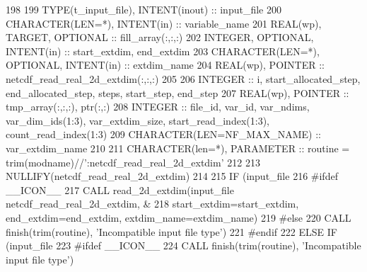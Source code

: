 \begin{DoxyCode}
198 
199     \textcolor{keywordtype}{TYPE}(t\_input\_file),         \textcolor{keywordtype}{INTENT(inout)} :: input\_file
200     \textcolor{keywordtype}{CHARACTER(LEN=*)},           \textcolor{keywordtype}{INTENT(in)}    :: variable\_name
201     \textcolor{keywordtype}{REAL(wp)}, \textcolor{keywordtype}{TARGET}, \textcolor{keywordtype}{OPTIONAL}                :: fill\_array(:,:,:)
202     \textcolor{keywordtype}{INTEGER}, \textcolor{keywordtype}{OPTIONAL},          \textcolor{keywordtype}{INTENT(in)}    :: start\_extdim, end\_extdim
203     \textcolor{keywordtype}{CHARACTER(LEN=*)}, \textcolor{keywordtype}{OPTIONAL}, \textcolor{keywordtype}{INTENT(in)}    :: extdim\_name
204     \textcolor{keywordtype}{REAL(wp)}, \textcolor{keywordtype}{POINTER}                         :: netcdf\_read\_real\_2d\_extdim(:,:,:)
205 
206     \textcolor{keywordtype}{INTEGER} :: i, start\_allocated\_step, end\_allocated\_step, steps, start\_step, end\_step
207     \textcolor{keywordtype}{REAL(wp)}, \textcolor{keywordtype}{POINTER} :: tmp\_array(:,:,:), ptr(:,:)
208     \textcolor{keywordtype}{INTEGER} :: file\_id, var\_id, var\_ndims, var\_dim\_ids(1:3), var\_extdim\_size, start\_read\_index(1:3), 
      count\_read\_index(1:3)
209     \textcolor{keywordtype}{CHARACTER(LEN=NF\_MAX\_NAME)} :: var\_extdim\_name
210 
211     \textcolor{keywordtype}{CHARACTER(len=*)}, \textcolor{keywordtype}{PARAMETER} :: routine = trim(modname)//\textcolor{stringliteral}{':netcdf\_read\_real\_2d\_extdim'}
212 
213     \textcolor{keyword}{NULLIFY}(netcdf\_read\_real\_2d\_extdim)
214 
215     \textcolor{keywordflow}{IF} (input\_file%
216 \textcolor{preprocessor}{#ifdef \_\_ICON\_\_}
217 \textcolor{preprocessor}{}      \textcolor{keyword}{CALL }read\_2d\_extdim(input\_file%
      netcdf\_read\_real\_2d\_extdim, &
218                           start\_extdim=start\_extdim, end\_extdim=end\_extdim, extdim\_name=extdim\_name)
219 \textcolor{preprocessor}{#else}
220 \textcolor{preprocessor}{}      \textcolor{keyword}{CALL }finish(trim(routine), \textcolor{stringliteral}{'Incompatible input file type'})
221 \textcolor{preprocessor}{#endif}
222 \textcolor{preprocessor}{}    \textcolor{keywordflow}{ELSE} \textcolor{keywordflow}{IF} (input\_file%
223 \textcolor{preprocessor}{#ifdef \_\_ICON\_\_}
224 \textcolor{preprocessor}{}      \textcolor{keyword}{CALL }finish(trim(routine), \textcolor{stringliteral}{'Incompatible input file type'})

\end{DoxyCode}
